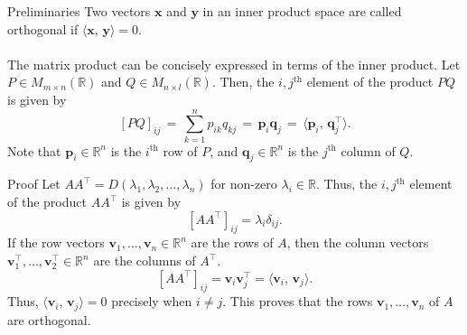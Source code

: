 \documentclass[handout]{beamer}
\def\x{\bm{x}}
\def\y{\bm{y}}
\def\v{\bm{v}}
\def\p{\bm{p}}
\def\q{\bm{q}}
\newcommand\ip[2]{\langle #1,\, #2 \rangle}
\begin{document}
        \begin{frame}{Preliminaries}
                Two vectors $\x$ and $\y$ in an inner product space are called orthogonal if $\ip{\x}{\y} = 0$. \\~\\
                \pause
                The matrix product can be concisely expressed in terms of the inner product. Let $P \in M_{m \times n}(\mathbb{R})$
                and $Q \in M_{n \times l}(\mathbb{R})$. Then, the $i, j^\text{th}$ element of the product $PQ$ is given by
                \[
                        [PQ]_{ij} \,=\, \sum_{k = 1}^n p_{ik}q_{kj} \,=\, \p_i\q_j \,=\, \ip{\p_i}{\q_j^\top}.
                \]
                Note that $\p_i \in \mathbb{R}^n$ is the $i^\text{th}$ row of $P$, and $\q_j \in \mathbb{R}^n$ is the $j^\text{th}$
                column of $Q$.
        \end{frame}

        \begin{frame}{Proof}
                Let $A A^\top = D(\lambda_1, \lambda_2, \dots, \lambda_n)$ for non-zero $\lambda_i \in \mathbb{R}$.
                Thus, the $i, j^\text{th}$ element of the product $A A^\top$ is given by
                \[
                        [A A^\top]_{ij} = \lambda_i\delta_{ij}.
                \] 
                \pause
                If the row vectors $\v_1, \dots, \v_n \in \mathbb{R}^n$ are the rows of $A$, then the column vectors
                $\v_1^\top, \dots, \v_2^\top \in \mathbb{R}^n$ are the columns of $A^\top$.
                \[
                        [A A^\top]_{ij} = \v_i\v_j^\top = \ip{\v_i}{\v_j}.
                \]
                \pause
                Thus, $\ip{\v_i}{\v_j} = 0$ precisely when $i \neq j$. This proves that the rows $\v_1, \dots, \v_n$ of $A$
                are orthogonal.
        \end{frame}
\end{document}

